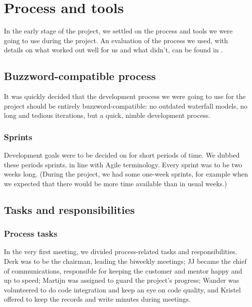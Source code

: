 \chapter{Process and tools}

In the early stage of the project, we settled on the process and tools we were going to use during the project. An evaluation of the process we used, with details on what worked out well for us and what didn't, can be found in .  

\section{Buzzword-compatible process}

It was quickly decided that the development process we were going to use for the project should be entirely buzzword-compatible: no outdated waterfall models, no long and tedious iterations, but a quick, nimble development process. 

\subsection{Sprints}

Development goals were to be decided on for short periods of time. We dubbed these periods sprints, in line with Agile terminology. Every sprint was to be two weeks long. (During the project, we had some one-week sprints, for example when we expected that there would be more time available than in usual weeks.) 

\section{Tasks and responsibilities}

\subsection{Process tasks}

In the very first meeting, we divided process-related tasks and responsibilities. Derk was to be the chairman, leading the biweekly meetings; JJ became the chief of communications, responsible for keeping the customer and mentor happy and up to speed; Martijn was assigned to guard the project's progress; Wander was volunteered to do code integration and keep an eye on code quality, and Kristel offered to keep the records and write minutes during meetings. 

